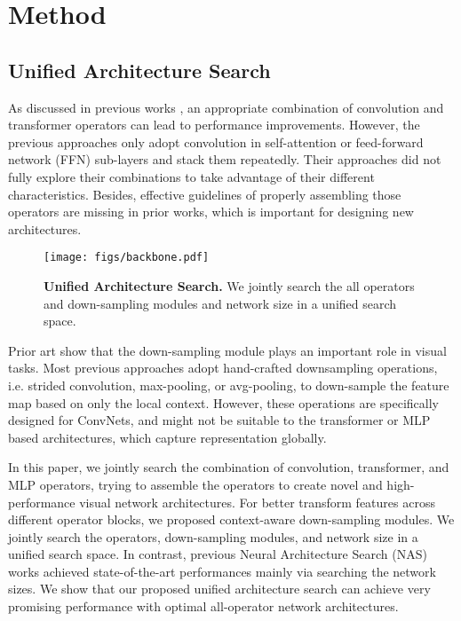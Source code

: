 \documentclass{article} \usepackage{iclr2022_conference,times}
\begin{document}
\section{Method}
\label{method}

\subsection{Unified Architecture Search}
\label{sec:uas}

As discussed in previous works \citep{convit}, an appropriate combination of convolution and transformer operators can lead to performance improvements. 
However, the previous approaches \citep{cvt, yuan2021incorporating} only adopt convolution in self-attention or feed-forward network (FFN) sub-layers and stack them repeatedly. Their approaches did not fully explore their combinations to take advantage of their different characteristics.
Besides, effective guidelines of properly assembling those operators are missing in prior works, which is important for designing new architectures.

\begin{figure}[t]
    \centering
    \texttt{[image: figs/backbone.pdf]}
    \vspace{-0.5em}
    \caption{\textbf{Unified Architecture Search.} We jointly search the all operators and down-sampling modules and network size in a unified search space.}
    \label{fig:backbone}
    \vspace{-1.5em}
\end{figure}

Prior art \citep{carafe++, zhang2019shiftinvar} show that the down-sampling module plays an important role in visual tasks. Most previous approaches adopt hand-crafted downsampling operations, i.e. strided convolution, max-pooling, or avg-pooling, to down-sample the feature map based on only the local context. However, these operations are specifically designed for ConvNets, and might not be suitable to the transformer or MLP based architectures, which capture representation globally. 

In this paper, we jointly search the combination of convolution, transformer, and MLP operators, trying to assemble the operators to create novel and high-performance visual network architectures. For better transform features across different operator blocks, we proposed context-aware down-sampling modules. We jointly search the operators, down-sampling modules, and network size in a unified search space. In contrast, previous Neural Architecture Search (NAS) works achieved state-of-the-art performances mainly via searching the network sizes. We show that our proposed unified architecture search can achieve very promising performance with optimal all-operator network architectures.
\end{document}
